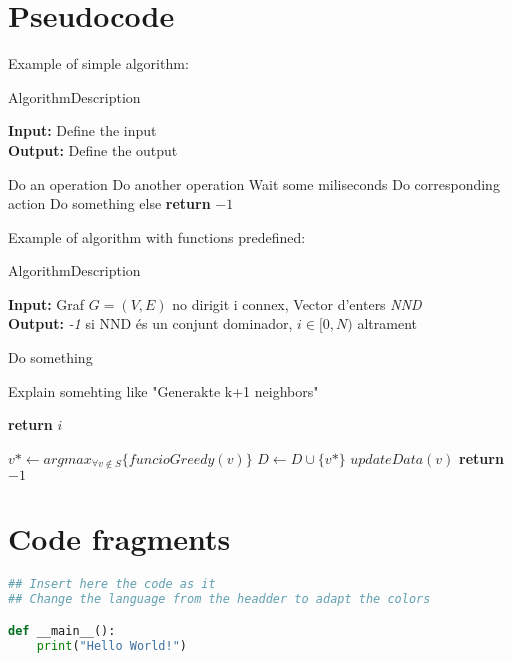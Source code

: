 \clearpage
\section{Pseudocode}

Example of simple algorithm:
\begin{algorithm}[H]
    \caption{AlgorithmDescription}
    \label{alg:label}
    \textbf{Input:} Define the input\\
    \textbf{Output:} Define the output
    
    \begin{algorithmic}[1]
        \STATE Do an operation
        \STATE Do another operation
        \STATE Wait some miliseconds
            \STATE Do corresponding action
        \ENDIF
        \STATE Do something else
        \STATE \textbf{return} $-1$
    \end{algorithmic}
\end{algorithm}

Example of algorithm with functions predefined:

\begin{algorithm}[H]
    \caption{AlgorithmDescription}
    \label{alg:label}
    \textbf{Input:} Graf $G = (V, E)$ no dirigit i connex, Vector d'enters \emph{NND}\\
    \textbf{Output:} \emph{-1} si NND és un conjunt dominador, $i \in [0, N)$ altrament
    \begin{algorithmic}[1]
    \FOR{each $i \in [0, N)$}
        \STATE Do something
    \ENDFOR
    
    \STATE Explain somehting like "Generakte k+1 neighbors"
    
        \STATE \textbf{return} $i$
    \ENDIF
    
        \STATE $v* \leftarrow arg max_{\forall v \not\in S } \{funcioGreedy(v)\}$
        \STATE $D \leftarrow  D  \cup  \{v*\}$
        \STATE $updateData(v)$
    \ENDWHILE
    \STATE \textbf{return} $-1$
    \end{algorithmic}
\end{algorithm}

\section{Code fragments}
\begin{lstlisting}[language=Python, caption={CaptionPythonCode}, label={code:label}]
## Insert here the code as it
## Change the language from the headder to adapt the colors

def __main__():
    print("Hello World!")
\end{lstlisting}